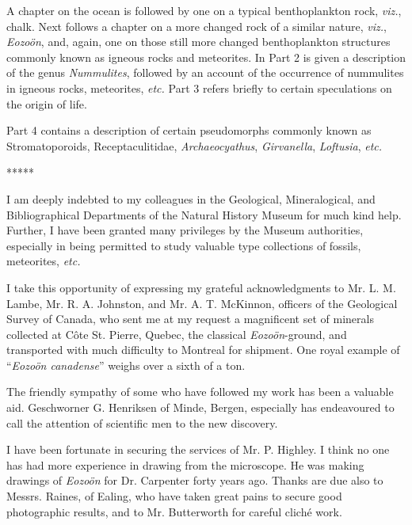 \documentclass[a4paper, 12pt, oneside, landscape]{article}
\begin{document}
A chapter on the ocean is followed by one on a typical benthoplankton rock, \emph{viz.}, chalk. Next follows a chapter on a more changed rock of a similar nature, \emph{viz.}, \emph{Eozoön}, and, again, one on those still more changed benthoplankton structures commonly known as igneous rocks and meteorites. In Part 2 is given a description of the genus \emph{Nummulites}, followed by an account of the occurrence of nummulites in igneous rocks, meteorites, \emph{etc.} Part 3 refers briefly to certain speculations on the origin of life.

Part 4 contains a description of certain pseudomorphs commonly known as Stromatoporoids, Receptaculitidae, \emph{Archaeocyathus}, \emph{Girvanella}, \emph{Loftusia}, \emph{etc.}

\centerline{*\hspace{15mm}*\hspace{15mm}*\hspace{15mm}*\hspace{15mm}*}
\bigskip

I am deeply indebted to my colleagues in the Geological, Mineralogical, and Bibliographical Departments of the Natural History Museum for much kind help. Further, I have been granted many privileges by the Museum authorities, especially in being permitted to study valuable type collections of fossils, meteorites, \emph{etc.}

I take this opportunity of expressing my grateful acknowledgments to Mr. L. M. Lambe, Mr. R. A. Johnston, and Mr. A. T. McKinnon, officers of the Geological Survey of Canada, who sent me at my request a magnificent set of minerals collected at Côte St. Pierre, Quebec, the classical \emph{Eozoön}-ground, and transported with much difficulty to Montreal for shipment. One royal example of ``\emph{Eozoön canadense}'' weighs over a sixth of a ton.

The friendly sympathy of some who have followed my work has been a valuable aid. Geschworner G. Henriksen of Minde, Bergen, especially has endeavoured to call the attention of scientific men to the new discovery.

I have been fortunate in securing the services of Mr. P. Highley. I think no one has had more experience in drawing from the microscope. He was making drawings of \emph{Eozoön} for Dr. Carpenter forty years ago. Thanks are due also to Messrs. Raines, of Ealing, who have taken great pains to secure good photographic results, and to Mr. Butterworth for careful cliché work.
\end{document}
